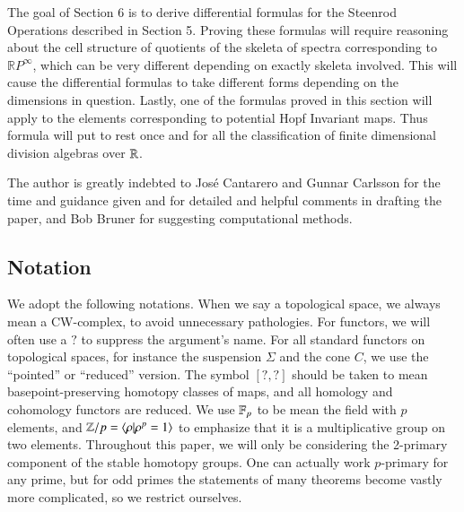 The goal of Section 6 is to derive differential formulas for the Steenrod Operations described in Section 5.
Proving these formulas will require reasoning about the cell structure of quotients of the skeleta of spectra corresponding to $\mathbb{R}P^\infty$, which can be very different depending on exactly skeleta involved.
This will cause the differential formulas to take different forms depending on the dimensions in question.
Lastly, one of the formulas proved in this section will apply to the elements corresponding to potential Hopf Invariant maps. 
Thus formula will put to rest once and for all the classification of finite dimensional division algebras over $\mathbb{R}$.  

The author is greatly indebted to Jos\'e Cantarero and Gunnar Carlsson for the time and guidance given and for detailed and helpful comments in drafting the paper, 
and Bob Bruner for suggesting computational methods.  



\subsection{Notation}

We adopt the following notations.
When we say a topological space, we always mean a CW-complex, to avoid unnecessary pathologies.  
For functors, we will often use a $?$ to suppress the argument's name.
For all standard functors on topological spaces, for instance the suspension $\Sigma$ and the cone $C$, we use the ``pointed'' or ``reduced'' version.
The symbol $[?,?]$ should be taken to mean basepoint-preserving homotopy classes of maps, and all homology and cohomology functors are reduced.  
We use $\mathbb{F}_p$ to be mean the field with $p$ elements, and $\mathbb{Z}/p=\langle \rho | \rho^p=1\rangle$ to emphasize that it is a multiplicative group on two elements.  
Throughout this paper, we will only be considering the 2-primary component of the stable homotopy groups.  
One can actually work $p$-primary for any prime, but for odd primes the statements of many theorems become vastly more complicated, so we restrict ourselves.  





